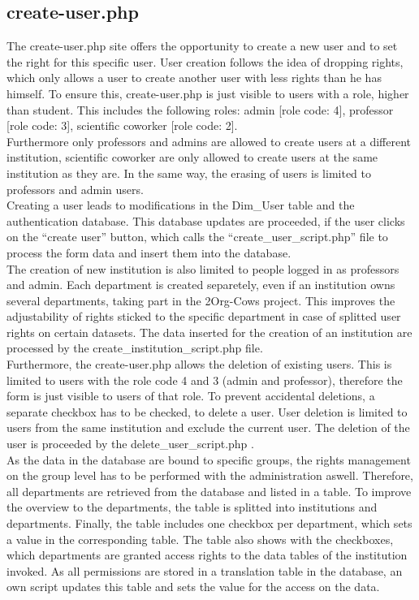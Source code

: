 
\label{create-user.php}
\subsection{create-user.php}
The create-user.php site offers the opportunity to create a new user and to set the right for this specific user. User creation follows the idea of dropping rights, 
which only allows a user to create another user with less rights than he has himself. To ensure this, create-user.php is just visible to users with a role, higher than student.
This includes the following roles: admin [role code: 4], professor [role code: 3], scientific coworker [role code: 2]. \\
Furthermore only professors and admins are allowed to create users at a different institution, scientific coworker are only allowed to create users at the 
same institution as they are. In the same way, the erasing of users is limited to professors and admin users.\\
Creating a user leads to modifications in the Dim\_User table and the authentication database. This database updates are proceeded, if the user clicks on 
the ``create user'' button, which calls the ``create\_user\_script.php'' file to process the form data and insert them into the database.\\ 
The creation of new institution is also limited to people logged in as professors and admin. Each department is created separetely, even if an institution owns several departments, 
taking part in the 2Org-Cows project. This improves the adjustability of rights sticked to the specific department in case of splitted user rights on certain datasets.
The data inserted for the creation of an institution are processed by the create\_institution\_script.php file.\\
Furthermore, the create-user.php allows the deletion of existing users. This is limited to users with the role code 4 and 3 (admin and professor), therefore the form is just visible 
to users of that role. To prevent accidental deletions, a separate checkbox has to be checked, to delete a user. User deletion is limited to users from the same institution and exclude 
the current user. The deletion of the user is proceeded by the delete\_user\_script.php .\\
As the data in the database are bound to specific groups, the rights management on the group level has to be performed with the administration aswell. Therefore, all departments are 
retrieved from the database and listed in a table. To improve the overview to the departments, the table is splitted into institutions and departments. Finally, the table includes 
one checkbox per department, which sets a value in the corresponding table. The table also shows with the checkboxes, which departments are granted access rights to the data tables 
of the institution invoked. As all permissions are stored in a translation table in the database, an own script updates this table 
and sets the value for the access on the data.

